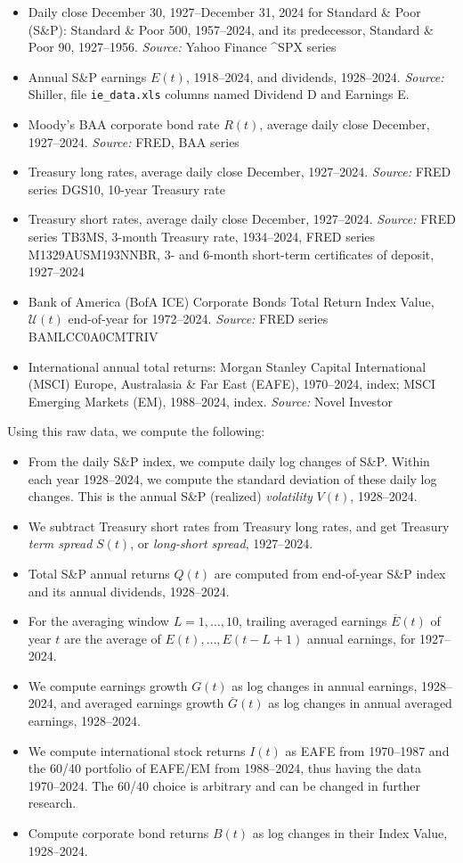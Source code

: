 \documentclass[12pt]{amsart}
\begin{document}
\begin{itemize}
\item Daily close December 30, 1927--December 31, 2024 for Standard \& Poor (S\&P): Standard \& Poor 500, 1957--2024, and its predecessor, Standard \& Poor 90, 1927--1956. {\it Source:} Yahoo Finance \^{}SPX series
\item Annual S\&P earnings $E(t)$, 1918--2024, and dividends, 1928--2024. {\it Source:} Shiller, file \texttt{ie\_data.xls} columns named Dividend D and Earnings E.
\item Moody's BAA corporate bond rate $R(t)$, average daily close December, 1927--2024. {\it Source:} FRED, BAA series
\item Treasury long rates, average daily close December, 1927--2024. {\it Source:} FRED series DGS10, 10-year Treasury rate
\item Treasury short rates, average daily close December, 1927--2024. {\it Source:} FRED series TB3MS, 3-month Treasury rate, 1934--2024, FRED series M1329AUSM193NNBR, 3- and 6-month short-term certificates of deposit, 1927--2024
\item Bank of America (BofA ICE) Corporate Bonds Total Return Index Value, $\mathcal U(t)$  end-of-year for 1972--2024. {\it Source:} FRED series BAMLCC0A0CMTRIV
\item International annual total returns: Morgan Stanley Capital International (MSCI) Europe, Australasia \& Far East (EAFE), 1970--2024, index; MSCI Emerging Markets (EM), 1988--2024, index. {\it Source:} Novel Investor
\end{itemize}

Using this raw data, we compute the following:

\begin{itemize}
\item From the daily S\&P index, we compute daily log changes of S\&P. Within each year 1928--2024, we compute the standard deviation of these daily log changes. This is the annual S\&P (realized) {\it volatility} $V(t)$, 1928--2024.
\item We subtract Treasury short rates from Treasury long rates, and get Treasury {\it term spread} $S(t)$, or {\it long-short spread}, 1927--2024.
\item Total S\&P annual returns $Q(t)$ are computed from end-of-year S\&P index and its annual dividends, 1928--2024.
\item For the averaging window $L = 1, \ldots, 10$, trailing averaged earnings $\overline{E}(t)$ of year $t$ are the average of $E(t), \ldots, E(t-L+1)$ annual earnings, for 1927--2024.
\item We compute earnings growth $G(t)$ as log changes in annual earnings, 1928--2024, and averaged earnings growth $\overline{G}(t)$ as log changes in annual averaged earnings, 1928--2024.
\item We compute international stock returns $I(t)$ as EAFE from 1970--1987 and the 60/40 portfolio of EAFE/EM from 1988--2024, thus having the data 1970--2024. The 60/40 choice is arbitrary and can be changed in further research.
\item Compute corporate bond returns $B(t)$ as log changes in their Index Value, 1928--2024. 
\end{itemize}
\end{document}
